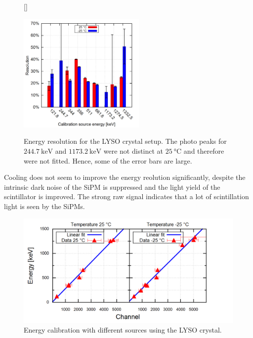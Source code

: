 \par 
\begin{figure}[t!]
	[\FBwidth]
	{\caption[Energy resolution for the LYSO crystal setup]{Energy resolution for the LYSO crystal setup. The photo peaks for $\SI{244.7}{\keV}$ and $\SI{1173.2}{\keV}$ were not distinct at $\SI{25}{\degreeCelsius}$ and therefore were not fitted. Hence, some of the error bars are large. }    
		\label{fig:ch5:lyso_resolution}}
	{\includegraphics[width=0.55\textwidth]{./plots/energy/lyso_resolution.png}}
\end{figure} 
Cooling does not seem to improve the energy reolution significantly, despite the intrinsic dark noise of the SiPM is suppressed and the light yield of the scintillator is improved. The strong raw signal indicates that a lot of scintillation light is seen by the SiPMs. 
\begin{figure}[H]
	\centering
	\includegraphics[width=1\linewidth]{./plots/energy/lyso_eichung.png}
	\caption[LYSO energy calibration]{Energy calibration with different sources using the LYSO crystal.}
	\label{fig:ch5:lyso_eichung}
\end{figure} 
